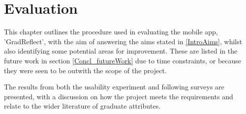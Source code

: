 \documentclass{l4proj}
\begin{document}


\chapter{Evaluation} \label{evaluation}

This chapter outlines the procedure used in evaluating the mobile app, 'GradReflect', with the aim of answering the aims stated in \ref{IntroAims}, whilst also identifying some potential areas for improvement. These are listed in the future work in section \ref{Concl_futureWork} due to time constraints, or because they were seen to be outwith the scope of the project. 

The results from both the usability experiment and following surveys are presented, with a discussion on how the project meets the requirements and relate to the wider literature of graduate attributes. 

\end{document}
